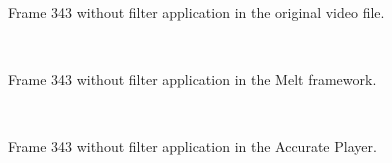 \documentclass[../MasterThesis.tex]{subfiles}
\begin{document}
\begin{minipage}{0.31\textwidth}
	\begin{figure}[H]
	\begin{center}
		\caption[Frame 343 without filter application in the original video file.]{Frame 343 without filter application in the original video file.}
		\label{figure:nofilterO}
	\end{center}
\end{figure}
\end{minipage}\begin{minipage}{0.03\textwidth}
\ 
\end{minipage}\begin{minipage}{0.31\textwidth}

\begin{figure}[H]
	\begin{center}
		\caption[Frame 343 without filter application in the Melt framework.]{Frame 343 without filter application in the Melt framework.}
		\label{figure:nofilterMelt}
	\end{center}
\end{figure}
\end{minipage}\begin{minipage}{0.03\textwidth}
\ 
\end{minipage}\begin{minipage}{0.31\textwidth}

\begin{figure}[H]
	\begin{center}
		\caption[Frame 343 without filter application in the Accurate Player.]{Frame 343 without filter application in the Accurate Player.}
		\label{figure:nofilterAP}
	\end{center}
\end{figure}
\end{minipage}



\end{document}
